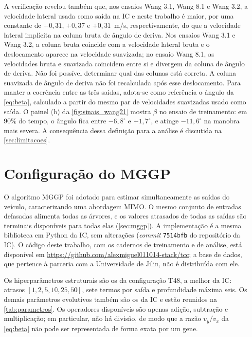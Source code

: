 A verificação revelou também que, nos ensaios Wang 3.1, Wang 8.1 e Wang 3.2, a velocidade lateral usada como saída na IC e neste trabalho é maior, por uma constante de $+0{,}31$, $+0{,}37$ e $+0{,}31$~m/s, respectivamente, do que a velocidade lateral implícita na coluna bruta de ângulo de deriva. Nos ensaios Wang 3.1 e Wang 3.2, a coluna bruta coincide com a velocidade lateral bruta e o deslocamento aparece na velocidade suavizada; no ensaio Wang 8.1, as velocidades bruta e suavizada coincidem entre si e divergem da coluna de ângulo de deriva. Não foi possível determinar qual das colunas está correta. A coluna suavizada de ângulo de deriva não foi recalculada após esse deslocamento. Para manter a coerência entre as três saídas, adota-se como referência o ângulo da \autoref{eq:beta}, calculado a partir do mesmo par de velocidades suavizadas usado como saída. O painel (h) da \autoref{fig:sinais_wang21} mostra $\beta$ no ensaio de treinamento: em 90\% do tempo, o ângulo fica entre $-6{,}8^\circ$ e $+1{,}7^\circ$, e atinge $-11{,}6^\circ$ na manobra mais severa. A consequência dessa definição para a análise é discutida na \autoref{sec:limitacoes}.

\section{Configuração do MGGP}\label{sec:config_mggp}

O algoritmo MGGP foi adotado para estimar simultaneamente as saídas do veículo, caracterizando uma abordagem MIMO. O mesmo conjunto de entradas defasadas alimenta todas as árvores, e os valores atrasados de todas as saídas são terminais disponíveis para todas elas (\autoref{sec:mggp}). A implementação é a mesma biblioteca em Python da IC, sem alterações (\textit{commit} \texttt{7514bfb} do repositório da IC). O código deste trabalho, com os cadernos de treinamento e de análise, está disponível em \url{https://github.com/alexmiguel011014-stack/tcc}; a base de dados, que pertence à parceria com a Universidade de Jilin, não é distribuída com ele.

Os hiperparâmetros estruturais são os da configuração T48, a melhor da IC: atrasos $[1, 2, 5, 10, 25, 50]$, sete termos por saída e profundidade máxima seis. Os demais parâmetros evolutivos também são os da IC e estão reunidos na \autoref{tab:parametros}. Os operadores disponíveis são apenas adição, subtração e multiplicação; em particular, não há divisão, de modo que a razão $v_y/v_x$ da \autoref{eq:beta} não pode ser representada de forma exata por um gene.

